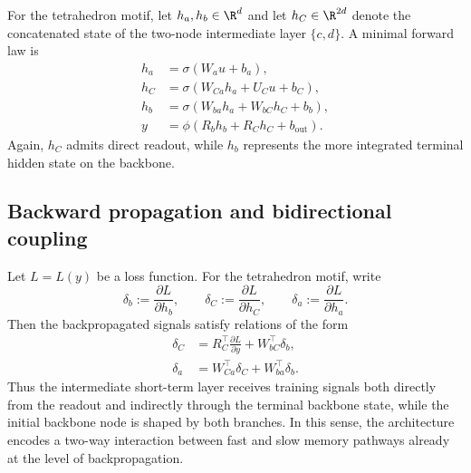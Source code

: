 \begin{example}
For the tetrahedron motif, let $h_a,h_b\in\R^d$ and let $h_C\in\R^{2d}$ denote the concatenated state of the two-node intermediate layer $\{c,d\}$. A minimal forward law is
\begin{align}
 h_a &= \sigma(W_a u + b_a), \label{eq:tetra-a}\\
 h_C &= \sigma(W_{Ca} h_a + U_C u + b_C), \label{eq:tetra-C}\\
 h_b &= \sigma(W_{ba} h_a + W_{bC} h_C + b_b), \label{eq:tetra-b}\\
 y &= \phi(R_b h_b + R_C h_C + b_{\mathrm{out}}). \label{eq:tetra-y}
\end{align}
Again, $h_C$ admits direct readout, while $h_b$ represents the more integrated terminal hidden state on the backbone.
\end{example}

\subsection{Backward propagation and bidirectional coupling}

Let $L=L(y)$ be a loss function. For the tetrahedron motif, write
\[
\delta_b := \frac{\partial L}{\partial h_b},
\qquad
\delta_C := \frac{\partial L}{\partial h_C},
\qquad
\delta_a := \frac{\partial L}{\partial h_a}.
\]
Then the backpropagated signals satisfy relations of the form
\begin{align}
 \delta_C
 &=
 R_C^\top \frac{\partial L}{\partial y}
 +
 W_{bC}^\top \delta_b,
 \label{eq:backprop-C}
 \\
 \delta_a
 &=
 W_{Ca}^\top \delta_C
 +
 W_{ba}^\top \delta_b.
 \label{eq:backprop-a}
\end{align}
Thus the intermediate short-term layer receives training signals both directly from the readout and indirectly through the terminal backbone state, while the initial backbone node is shaped by both branches. In this sense, the architecture encodes a two-way interaction between fast and slow memory pathways already at the level of backpropagation.

